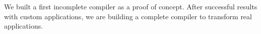 We built a first incomplete compiler as a proof of concept.
After successful results with custom applications, we are building a complete compiler to transform real applications.









